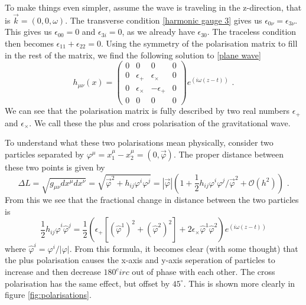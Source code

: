\documentclass[11pt]{cuthesis}
\newcommand{\mn}{_{\mu\nu}}
\newcommand{\fs}{\text{ .}}
\begin{document}
To make things even simpler, assume the wave is traveling in the z-direction, that is $\vec{k} = (0,0,\omega)$. The transverse condition \ref{harmonic gauge 3} gives us $\epsilon_{0\nu} = \epsilon_{3\nu}$. This gives us $\epsilon_{0 0}= 0$ and $\epsilon_{3 i} = 0$, as we already have $\epsilon_{3 0}$. The traceless condition then becomes $\epsilon_{1 1} + \epsilon_{2 2} = 0$. Using the symmetry of the polarisation matrix to fill in the rest of the matrix, we find the following solution to \ref{plane wave} 
\[
h\mn (x)
=
\begin{pmatrix} \label{gw solution}
0 & 0 & 0 & 0 \\
0 & \epsilon_+ & \epsilon_\times & 0 \\
0 & \epsilon_\times & -\epsilon_+ & 0 \\
0 & 0 & 0 & 0 
\end{pmatrix}
e^{(i\omega (z-t))} \fs
\] 
We can see that the polarisation matrix is fully described by two real numbers $\epsilon_+$ and $\epsilon_\times$. We call these the plus and cross polarisation of the gravitational wave.

To understand what these two polarisations mean physically, consider two particles separated by $\varphi^\mu = x_1^\mu - x_2^\mu = (0,\vec{\varphi})$. The proper distance between these two points is given by
\begin{equation} \label{deltaL}
\Delta L = \sqrt{g\mn dx^\mu dx^\nu} = \sqrt{\vec{\varphi}^2 + h_{ij}\varphi^i \varphi^j} = | \vec{\varphi} | (1 + \frac{1}{2}h_{ij}\varphi^i \varphi^j / \vec{\varphi}^2 + \mathcal{O}(h^2) ) \fs
\end{equation} 
From this we see that the fractional change in distance between the two particles is
\begin{equation}
\frac{1}{2}h_{ij}\hat{\varphi}^i \hat{\varphi}^j = \frac{1}{2}\left( \epsilon_+ \left[ (\hat{\varphi}^1)^2 + (\hat{\varphi}^2)^2 \right] +2\epsilon_\times \hat{\varphi}^1\hat{\varphi}^2 \right) e^{(i\omega (z-t))}
\end{equation}
where $\hat{\varphi}^i = \varphi^i/|\varphi|$. From this formula, it becomes clear (with some thought) that the plus polarisation causes the x-axis and y-axis seperation of particles to increase and then decrease $180^circ$ out of phase with each other. The cross polarisation has the same effect, but offset by $45^\circ$. This is shown more clearly in figure \ref{fig:polarisations}. 
\end{document}
